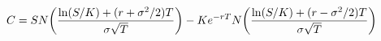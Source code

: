 \documentclass[preview]{standalone}
\begin{document}
\begin{align*}
\special{dvisvgm:raw <g id='unique000'>}C = S N\!\left(\frac{\ln(S/K)+(r+\sigma^2/2)T}{\sigma\sqrt{T}}\right) \special{dvisvgm:raw </g>}\special{dvisvgm:raw <g id='unique001'>}-Ke^{-rT}N\!\left(\frac{\ln(S/K)+(r-\sigma^2/2)T}{\sigma\sqrt{T}}\right)\special{dvisvgm:raw </g>}
\end{align*}
\end{document}
